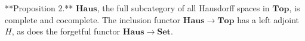 **Proposition 2.** $\mathbf{Haus}$, the full subcategory of all Hausdorff spaces in $\mathbf{Top}$, is complete and cocomplete. The inclusion functor $\mathbf{Haus} \to \mathbf{Top}$ has a left adjoint $H$, as does the forgetful functor $\mathbf{Haus} \to \mathbf{Set}$.
